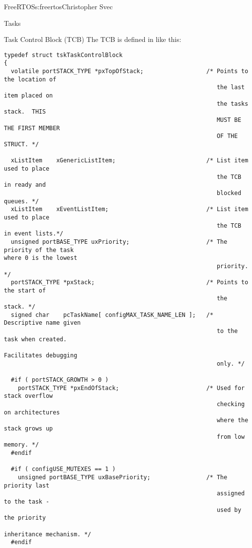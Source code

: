 \begin{aosachapter}{FreeRTOS}{s:freertos}{Christopher Svec}
\begin{aosasect1}{Tasks}
\begin{aosasect2}{Task Control Block (TCB)}
The TCB is defined in  like this:

\begin{verbatim}
typedef struct tskTaskControlBlock
{
  volatile portSTACK_TYPE *pxTopOfStack;                  /* Points to the location of
                                                             the last item placed on 
                                                             the tasks stack.  THIS 
                                                             MUST BE THE FIRST MEMBER 
                                                             OF THE STRUCT. */
                                                         
  xListItem    xGenericListItem;                          /* List item used to place 
                                                             the TCB in ready and 
                                                             blocked queues. */
  xListItem    xEventListItem;                            /* List item used to place 
                                                             the TCB in event lists.*/
  unsigned portBASE_TYPE uxPriority;                      /* The priority of the task                                                              where 0 is the lowest 
                                                             priority. */
  portSTACK_TYPE *pxStack;                                /* Points to the start of 
                                                             the stack. */
  signed char    pcTaskName[ configMAX_TASK_NAME_LEN ];   /* Descriptive name given 
                                                             to the task when created.
                                                             Facilitates debugging 
                                                             only. */

  #if ( portSTACK_GROWTH > 0 )
    portSTACK_TYPE *pxEndOfStack;                         /* Used for stack overflow 
                                                             checking on architectures
                                                             where the stack grows up
                                                             from low memory. */
  #endif

  #if ( configUSE_MUTEXES == 1 )
    unsigned portBASE_TYPE uxBasePriority;                /* The priority last 
                                                             assigned to the task - 
                                                             used by the priority 
                                                             inheritance mechanism. */
  #endif


\end{verbatim}
\end{aosasect2}
\end{aosasect1}
\end{aosachapter}
